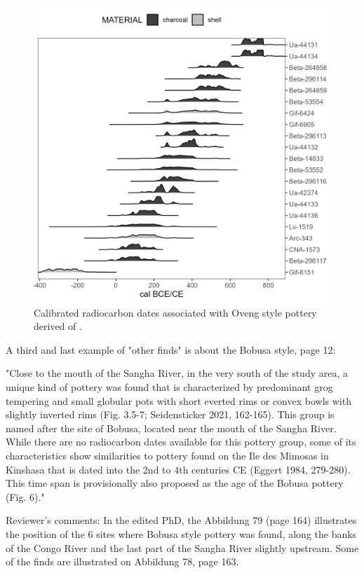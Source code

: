 \begin{reviewer}
\begin{figure}[!tb]
	\includegraphics[width=\textwidth]{fig/varia_c14_oveng.jpg}
	\caption{Calibrated radiocarbon dates associated with Oveng style pottery derived of \citet{Seidensticker.2021f}.}
	\label{fig:14c_oveng}
\end{figure}

\point A third and last example of "other finds" is about the Bobusa style, page 12:

"Close to the mouth of the Sangha River, in the very south of the study area, a unique kind of pottery was found that is characterized by predominant grog tempering and small globular pots with short everted rims or convex bowls with slightly inverted rims (Fig. 3.5-7; Seidensticker 2021, 162-165). This group is named after the site of Bobusa, located near the mouth of the Sangha River. While there are no radiocarbon dates available for this pottery
group, some of its characteristics show similarities to pottery found on the Ile des Mimosas in Kinshasa that is dated into the 2nd to 4th centuries CE (Eggert 1984, 279-280). This time span is provisionally also proposed as the age of the Bobusa pottery (Fig. 6)."

Reviewer's comments:
In the edited PhD, the Abbildung 79 (page 164) illustrates the position of the 6 sites where Bobusa style pottery was found, along the banks of the Congo River and the last part of the Sangha River slightly upstream. Some of the finds are illustrated on Abbildung 78, page 163.


\end{reviewer}
